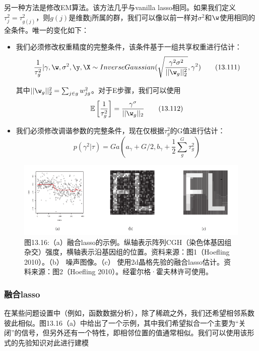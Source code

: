 \documentclass[a4paper]{article}
\begin{document}
另一种方法是修改EM算法。该方法几乎与vanilla lasso相同。如果我们定义$\tau_j^2=\tau_{g(j)}^2$，则$g(j)$是维数j所属的群，我们可以像以前一样对$\sigma^2$和$\w$使用相同的全条件。唯一的变化如下：

\begin{itemize}
\item 我们必须修改权重精度的完整条件，该条件基于一组共享权重进行估计：
\begin{equation}
\frac{1}{\tau_g^2}|\gamma,\w,\sigma^2,\y,\X\sim InverseGaussian(\sqrt{\frac{\gamma^2\sigma^2}{||\w_g||_2^2}},\gamma^2)\tag{13.111}
\end{equation}

其中$||\w_g||_2^2=\sum\nolimits_{j\in g}w_{jg}^2$。对于E步骤，我们可以使用
\begin{equation}
	\mathbb{E}\left[\frac{1}{\tau_g^2}\right]=\frac{\gamma^\sigma}{||\w_g||_2}\tag{13.112}
\end{equation}
\item 我们必须修改调谐参数的完整条件，现在仅根据$\tau_g^2$的G值进行估计：
\begin{equation}
	p(\gamma^2|\tau)=Ga(a_\gamma+G/2,b_\gamma+\frac{1}{2}\sum_{g}^{G}\tau_g^2)\tag{13.113}
\end{equation}
\end{itemize}

\begin{figure}[h]
	\centering
	\includegraphics[width=0.7\linewidth]{fig13/figure16}
	\caption*{图13.16:（a）融合lasso的示例。纵轴表示阵列CGH（染色体基因组杂交）强度，横轴表示沿基因组的位置。资料来源：图1（Hoefling 2010）。（b） 噪声图像。（c） 使用2d晶格先验的融合lasso估计。资料来源：图2（Hoefling 2010）。经霍尔格·霍夫林许可使用。}
\end{figure}

\subsubsection{融合lasso}
在某些问题设置中（例如，函数数据分析），除了稀疏之外，我们还希望相邻系数彼此相似。图13.16（a）中给出了一个示例，其中我们希望拟合一个主要为“关闭”的信号，但另外还有一个特性，即相邻位置的值通常相似。我们可以使用该形式的先验知识对此进行建模
\end{document}
